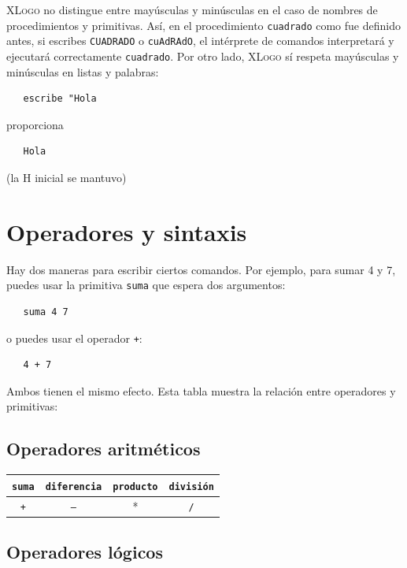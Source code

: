 \textsc{XLogo} no distingue entre may\'usculas y min\'usculas en el caso de
nombres de procedimientos y primitivas. As\'i, en el procedimiento
\texttt{cuadrado} como fue definido antes, si escribes \texttt{CUADRADO} o
\texttt{cuAdRAdO}, el int\'erprete de comandos interpretar\'a y ejecutar\'a
correctamente \texttt{cuadrado}. Por otro lado, \textsc{XLogo} s\'i respeta
may\'usculas y min\'usculas en listas y palabras: 
\begin{verbatim}
   escribe "Hola \end{verbatim}
proporciona
\begin{verbatim}
   Hola \end{verbatim}
(la H inicial se mantuvo)

\section{Operadores y sintaxis}
   \label{Operadores-Sintaxis}

Hay dos maneras para escribir ciertos comandos. Por ejemplo, para
sumar 4 y 7, puedes usar la primitiva \texttt{suma} que espera dos
argumentos: 
\begin{verbatim}
   suma 4 7 \end{verbatim}
o puedes usar el operador \texttt{+}: 
\begin{verbatim}
   4 + 7 \end{verbatim}
Ambos tienen el mismo efecto. Esta tabla muestra la relaci\'on entre
operadores y primitivas:

\subsection{Operadores aritm\'eticos}

\begin{center} \begin{tabular}{|*{4}{c|}} \hline 
   \texttt{suma} \index{suma@\texttt{suma}} & 
      \texttt{diferencia} \index{diferencia@\texttt{diferencia}} &
         \texttt{producto} \index{producto@\texttt{producto}} &
            \texttt{divisi\'on} \index{divisi\'on@\texttt{divisi\'on}} \\ \hline
   \texttt{+} & \texttt{--} & * & \texttt{/} \\ \hline
\end{tabular} \end{center}

\subsection{Operadores l\'ogicos}

